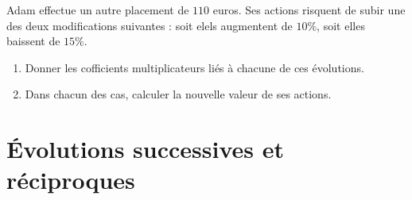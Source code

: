 \documentclass[11pt]{article}
\begin{document}
\begin{app}
  Adam effectue un autre placement de $110$ euros. Ses actions risquent de subir
  une des deux modifications suivantes : soit elels augmentent de $10\%$, soit
  elles baissent de $15\%$.
  \begin{enumerate}
    \item Donner les cofficients multiplicateurs liés à chacune de ces
      évolutions.
    \item Dans chacun des cas, calculer la nouvelle valeur de ses actions.
  \end{enumerate}
\end{app}

\section{Évolutions successives et réciproques}
\end{document}
